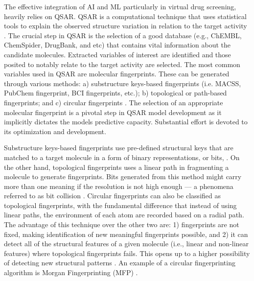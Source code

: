 The effective integration of AI and ML particularly in virtual drug screening, heavily relies on QSAR. QSAR is a computational technique that uses statistical tools to explain the observed structure variation in relation to the target activity \cite{ammad2014integrative}. The crucial step in QSAR is the selection of a good database (e.g., ChEMBL, ChemSpider, DrugBank, and etc) that contains vital information about the candidate molecules. Extracted variables of interest are identified and those posited to notably relate to the target activity are selected. The most common variables used in QSAR are molecular fingerprints. These can be generated through various methods: a) substructure keys-based fingerprints (i.e. MACSS, PubChem fingerprint, BCI fingerprints, etc.); b) topological or path-based fingerprints; and c) circular fingerprints \cite{cereto2015MF}. The selection of an appropriate molecular fingerprint is a pivotal step in QSAR model development as it implicitly dictates the models predictive capacity. Substantial effort is devoted to its optimization and development. 

Substructure keys-based fingerprints use pre-defined structural keys that are matched to a target molecule in a form of binary representations, or bits, \cite{christie1990MACCS}. On the other hand, topological fingerprints uses a linear path in fragmenting a molecule to generate fingerprints. Bits generated from this method might carry more than one meaning if the resolution is not high enough --- a phenomena referred to as bit collision \cite{cereto2015MF}. Circular fingerprints can also be classified as topological fingerprints, with the fundamental difference that instead of using linear paths, the environment of each atom are recorded based on a radial path. The advantage of this technique over the other two are: 1) fingerprints are not fixed, making identification of new meaningful fingerprints possible, and 2) it can detect all of the structural features of a given molecule (i.e., linear and non-linear features) where topological fingerprints fails. This opens up to a higher possibility of detecting new structural patterns \cite{rogers2010extended}. An example of a circular fingerprinting algorithm is Morgan Fingerprinting (MFP) \cite{morgan1965generation}. 

